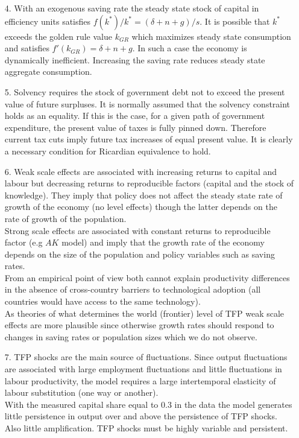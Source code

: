 \documentclass[12pt,a4]{article}
\begin{document}
\begin{enumerate}
\item [4.] With an exogenous saving rate the steady state stock of capital in
  efficiency units satisfies $f(k^{*})/k^{*}=(\delta+n+g)/s.$ It is
  possible that $k^{*}$ exceeds the golden rule value $k_{GR}$ which
  maximizes steady state consumption and satisfies
  $f'(k_{GR})=\delta+n+g.$ In such a case the economy is dynamically
  inefficient.  Increasing the saving rate reduces steady state
  aggregate consumption.
\item [5.] Solvency requires the stock of government debt not to exceed the
  present value of future surpluses. It is normally assumed that the
  solvency constraint holds as an equality. If this is the case, for a
  given path of government expenditure, the present value of taxes is
  fully pinned down. Therefore current tax cuts imply future tax
  increases of equal present value. It is clearly a necessary
  condition for Ricardian equivalence to hold.
\item [6.] Weak scale effects are associated with increasing returns to
  capital and labour but decreasing returns to reproducible factors
  (capital and the stock of knowledge). They imply that policy does
  not affect the steady state rate of growth of the economy (no level
  effects) though the latter depends on the rate of growth of the population.\\
  Strong scale effects are associated with constant returns to
  reproducible factor (e.g $AK$ model) and imply that the growth rate
  of the economy depends on the size of the population and policy
  variables such as saving rates.\\
  From an empirical point of view both cannot explain productivity
  differences in the absence of cross-country barriers to
  technological adoption (all countries would have access to the same
  technology).\\
  As theories of what determines the world (frontier) level of TFP
  weak scale effects are more plausible since otherwise growth rates
  should respond to changes in saving rates or population sizes which
  we do not observe.


\item [7.] TFP shocks are the main source of fluctuations. Since output
  fluctuations are associated with large employment fluctuations and
  little fluctuations in labour productivity, the model requires a
  large intertemporal elasticity of labour substitution (one way or another).\\
  With the measured capital share equal to 0.3 in the data the model
  generates little persistence in output over and above the
  persistence of TFP shocks. Also little amplification. TFP shocks
  must be highly variable and persistent.

\end{enumerate}
\end{document}
